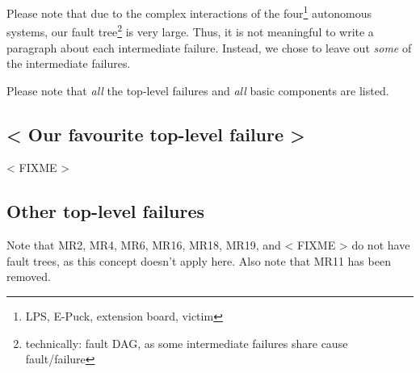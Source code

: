 \documentclass[a4paper,parskip,headheight=38pt]{scrartcl} %
\newcommand{\incomplete}[1]{\textless{} #1 \textgreater{}}
\begin{document}
Please note that due to the complex interactions of the
four\footnote{LPS, E-Puck, extension board, victim} autonomous systems,
our fault tree\footnote{technically: fault DAG, as some intermediate
failures share cause fault/failure} is very large.  Thus, it is not
meaningful to write a paragraph about each intermediate failure.
Instead, we chose to leave out \emph{some} of the intermediate
failures.

Please note that \emph{all} the top-level failures and \emph{all} basic
components are listed.

\subsection*{\incomplete{Our favourite top-level failure}}

\incomplete{FIXME}


\subsection*{Other top-level failures}

Note that MR2, MR4, MR6, MR16, MR18, MR19, and \incomplete{FIXME} do
not have fault trees, as this concept doesn't apply here.  Also note
that MR11 has been removed.
\end{document}
